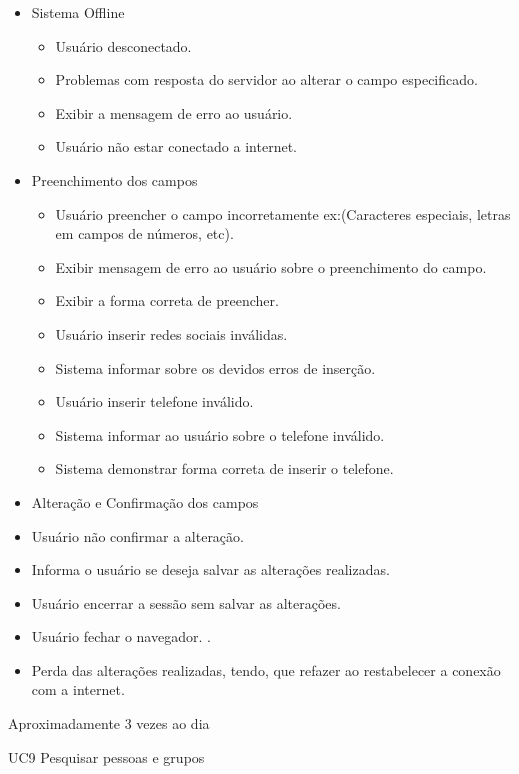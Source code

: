 {
\begin{itemize}
	\item Sistema Offline
	   \begin{itemize}	
		\item Usuário desconectado.
		\item Problemas com resposta do servidor ao alterar o campo especificado.
		\item Exibir a mensagem de erro ao usuário.
		\item Usuário não estar conectado a internet.
     	    \end{itemize}
	\item Preenchimento dos campos    
	    \begin{itemize}
		\item Usuário preencher o campo incorretamente ex:(Caracteres especiais, letras em campos de números, etc).
		\item Exibir mensagem de erro ao usuário sobre o preenchimento do campo.
		\item Exibir a forma correta de preencher.
		\item Usuário inserir redes sociais inválidas.
		\item Sistema informar sobre os devidos erros de inserção.
		\item Usuário inserir telefone inválido.
		\item Sistema informar ao usuário sobre o telefone inválido.
		\item Sistema demonstrar forma correta de inserir o telefone.
	     \end{itemize}
	\item Alteração e Confirmação dos campos     
		\item Usuário não confirmar a alteração.
		\item Informa o usuário se deseja salvar as alterações realizadas.
		\item Usuário encerrar a sessão sem salvar as alterações.
		\item Usuário fechar o navegador.
	.	\item Perda das alterações realizadas, tendo, que refazer ao restabelecer a conexão com a internet.
\end{itemize}
}
{Aproximadamente 3 vezes ao dia}
{

}
\casoDeUso
{UC9}
{Pesquisar pessoas e grupos}
